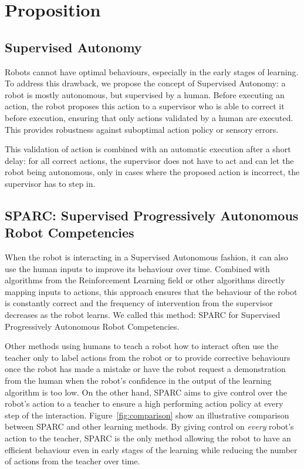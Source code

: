 \documentclass[conference]{IEEEtran}
\begin{document}
\section{Proposition}

\subsection{Supervised Autonomy}

Robots cannot have optimal behaviours, especially in the early stages of
learning. To address this drawback, we propose the concept of Supervised
Autonomy: a robot is mostly autonomous, but supervised by a human. Before
executing an action, the robot proposes this action to a supervisor who is able
to correct it before execution, ensuring that only actions validated by a human
are executed. This provides robustness against suboptimal action policy or sensory
errors.

This validation of action is combined with an automatic execution after a short
delay: for all correct actions, the supervisor does not have to act and can let
the robot being autonomous, only in cases where the proposed action is
incorrect, the supervisor has to step in.

\subsection{SPARC: Supervised Progressively Autonomous Robot Competencies}

When the robot is interacting in a Supervised Autonomous fashion, it can also
use the human inputs to improve its behaviour over time. Combined with
algorithms from the Reinforcement Learning field or other algorithms directly
mapping inputs to actions, this approach ensures that the behaviour of the robot
is constantly correct and the frequency of intervention from the supervisor
decreases as the robot learns. We called this method: SPARC for Supervised
Progressively Autonomous Robot Competencies.

Other methods using humans to teach a robot how to interact often use the
teacher only to label actions from the robot or to provide corrective behaviours
once the robot has made a mistake or have the robot request a demonstration from
the human when the robot's confidence in the output of the learning algorithm is too
low.  On the other hand, SPARC aims to give control over the robot's action to a
teacher to ensure a high performing action policy at every step of the
interaction.  Figure~\ref{fig:comparison} show an illustrative comparison
between SPARC and other learning methods. By giving control on \emph{every}
robot's action to the teacher, SPARC is the only method allowing the robot to
have an efficient behaviour even in early stages of the learning while reducing
the number of actions from the teacher over time.
\end{document}
